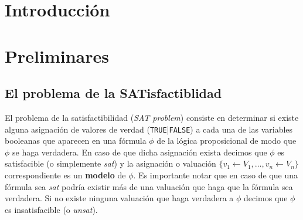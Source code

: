 \documentclass[a4paper, 11pt, twoside]{tesis}
\begin{document}
\def\autor{Ignacio Vissani}
\def\titulo{Acelerando ParAlloy mediante la reutilización de cláusulas
aprendidas} 
\def\runtitulo{Acelerando ParAlloy mediante la reutilización de cláusulas
aprendidas}
\def\runtitle{Speeding up ParAlloy reusing learnt clauses}
\def\director{Carlos Gustavo López Pombo}
\def\codirector{Nicolás Leandro Rosner}
\def\lugar{Buenos Aires, 2012}


\frontmatter
\pagestyle{empty}


\cleardoublepage


\cleardoublepage

\cleardoublepage

\cleardoublepage
\tableofcontents

\mainmatter
\pagestyle{headings}

\newcommand{\true}{\texttt{TRUE}\xspace}
\newcommand{\false}{\texttt{FALSE}\xspace}
\newcommand{\sat}{\emph{sat}\xspace}
\newcommand{\unsat}{\emph{unsat}\xspace}
\newcommand{\cnf}{\texttt{\textbf{CNF}}\xspace}
\newcommand{\npc}{\textbf{NP-Complete}\xspace}
\newcommand{\bt}{\emph{backtracking}\xspace}

\newcommand{\soft}{\emph{software}\xspace}
\newcommand{\hard}{\emph{hardware}\xspace}

\listoftodos

\chapter{Introducción}




\chapter{Preliminares}

\newcommand{\disj}[1]{\ensuremath{[#1]}}
\newcommand{\conj}[1]{\ensuremath{\{#1\}}}

\section{El problema de la SATisfactiblidad}

El problema de la satisfactibilidad (\emph{SAT problem}) consiste en determinar
si existe alguna asignación de valores de verdad (\true|\false) a cada una de
las variables booleanas que aparecen en una fórmula $\phi$ de la lógica
proposicional de modo que $\phi$ se haga verdadera. En caso de que dicha
asignación exista decimos que $\phi$ es satisfacible (o simplemente \sat) y la
asignación o valuación $\{ v_1 \leftarrow V_1, \ldots, v_n \leftarrow V_n \}$
correspondiente es un \textbf{modelo} de $\phi$. Es importante notar que en caso
de que una fórmula sea \sat podría existir más de una valuación que haga que la
fórmula sea verdadera. Si no existe ninguna valuación que haga verdadera a
$\phi$ decimos que $\phi$ es insatisfacible (o \unsat).
\end{document}
